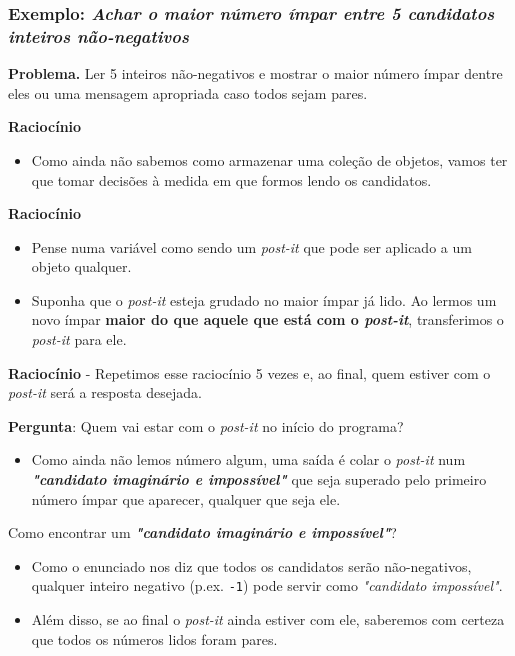 \documentclass[11pt,a4paper]{article}
\providecommand{\tightlist}{%
      \setlength{\itemsep}{0pt}\setlength{\parskip}{0pt}}
\begin{document}
    \subsubsection{\texorpdfstring{Exemplo: \emph{Achar o maior número ímpar
entre 5 candidatos inteiros
não-negativos}}{Exemplo: Achar o maior número ímpar entre 5 candidatos inteiros não-negativos}}\label{exemplo-achar-o-maior-nuxfamero-uxedmpar-entre-5-candidatos-inteiros-nuxe3o-negativos}

\textbf{Problema.} Ler 5 inteiros não-negativos e mostrar o maior número
ímpar dentre eles ou uma mensagem apropriada caso todos sejam pares.

    \textbf{Raciocínio}

\begin{itemize}
\tightlist
\item
  Como ainda não sabemos como armazenar uma coleção de objetos, vamos
  ter que tomar decisões à medida em que formos lendo os candidatos.
\end{itemize}

    \textbf{Raciocínio}

\begin{itemize}
\tightlist
\item
  Pense numa variável como sendo um \emph{post-it} que pode ser aplicado
  a um objeto qualquer.
\item
  Suponha que o \emph{post-it} esteja grudado no maior ímpar já lido. Ao
  lermos um novo ímpar \textbf{maior do que aquele que está com o
  \emph{post-it}}, transferimos o \emph{post-it} para ele.
\end{itemize}

    \textbf{Raciocínio} - Repetimos esse raciocínio 5 vezes e, ao final,
quem estiver com o \emph{post-it} será a resposta desejada.

    \textbf{Pergunta}: Quem vai estar com o \emph{post-it} no início do
programa?

    \begin{itemize}
\tightlist
\item
  Como ainda não lemos número algum, uma saída é colar o \emph{post-it}
  num \textbf{\emph{"candidato imaginário e impossível"}} que seja
  superado pelo primeiro número ímpar que aparecer, qualquer que seja
  ele.
\end{itemize}

    Como encontrar um \textbf{\emph{"candidato imaginário e impossível"}}?

    \begin{itemize}
\tightlist
\item
  Como o enunciado nos diz que todos os candidatos serão não-negativos,
  qualquer inteiro negativo (p.ex. \texttt{-1}) pode servir como
  \emph{"candidato impossível"}.
\item
  Além disso, se ao final o \emph{post-it} ainda estiver com ele,
  saberemos com certeza que todos os números lidos foram pares.
\end{itemize}
\end{document}
